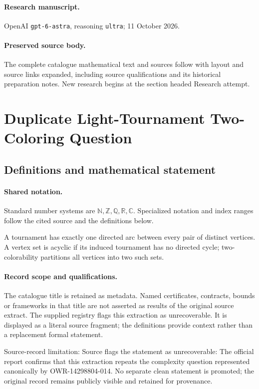 \documentclass[11pt]{article}
\begin{document}
\paragraph{Research manuscript.} OpenAI \texttt{gpt-6-astra}, reasoning \texttt{ultra}; 11 October 2026.
\paragraph{Preserved source body.} The complete catalogue mathematical text and sources follow with layout and source links expanded, including source qualifications and its historical preparation notes. New research begins at the section headed Research attempt.

\section{Duplicate Light-Tournament Two-Coloring Question}\label{statement}

\subsection{Definitions and mathematical statement}

\paragraph{Shared notation.}Standard number systems are $\mathbb N,\mathbb Z,\mathbb Q,\mathbb R,\mathbb C$. Specialized notation and index ranges follow the cited source and the definitions below.


A tournament has exactly one directed arc between every pair of distinct vertices. A vertex set is acyclic if its induced tournament has no directed cycle; two-colorability partitions all vertices into two such sets.
\paragraph{Record scope and qualifications.}
The catalogue title is retained as metadata. Named certificates, contracts, bounds or frameworks in that title are not asserted as results of the original source extract.
The supplied registry flags this extraction as unrecoverable. It is displayed as a literal source fragment; the definitions provide context rather than a replacement formal statement.

Source-record limitation: Source flags the statement as unrecoverable: The official report confirms that this extraction repeats the complexity question represented canonically by OWR-14298804-014. No separate clean statement is promoted; the original record remains publicly visible and retained for provenance.
\end{document}
